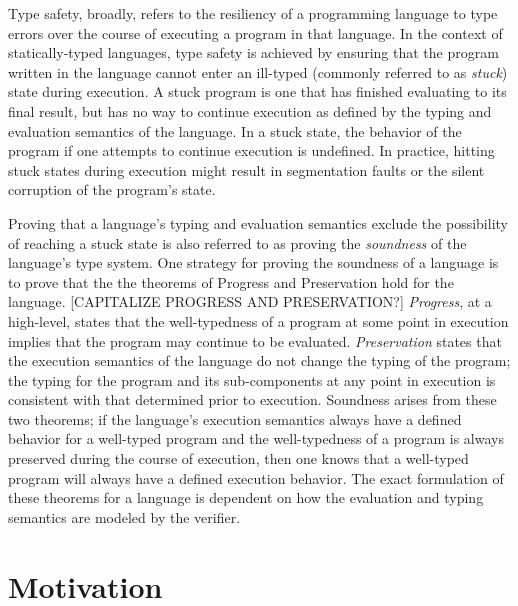 \documentclass{sig-alternate}
\begin{document}
Type safety, broadly, refers to the resiliency of a programming language to type errors over the course of executing a program in that language. In the context of statically-typed languages, type safety is achieved by ensuring that the program written in the language cannot enter an ill-typed (commonly referred to as {\em stuck}) state during execution. A stuck program is one that has finished evaluating to its final result, but has no way to continue execution as defined by the typing and evaluation semantics of the language. In a stuck state, the behavior of the program if one attempts to continue execution is undefined. In practice, hitting stuck states during execution might result in segmentation faults or the silent corruption of the program's state.

Proving that a language's typing and evaluation semantics exclude the possibility of reaching a stuck state is also referred to as proving the {\em soundness} of the language's type system. One strategy for proving the soundness of a language is to prove that the the theorems of Progress and Preservation hold for the language. [CAPITALIZE PROGRESS AND PRESERVATION?] {\em Progress}, at a high-level, states that the well-typedness of a program at some point in execution implies that the program may continue to be evaluated. {\em Preservation} states that the execution semantics of the language do not change the typing of the program; the typing for the program and its sub-components at any point in execution is consistent with that determined prior to execution. Soundness arises from these two theorems; if the language's execution semantics always have a defined behavior for a well-typed program and the well-typedness of a program is always preserved during the course of execution, then one knows that a well-typed program will always have a defined execution behavior. The exact formulation of these theorems for a language is dependent on how the evaluation and typing semantics are modeled by the verifier.


\section{Motivation}
\label{sec:motivation}
\end{document}
